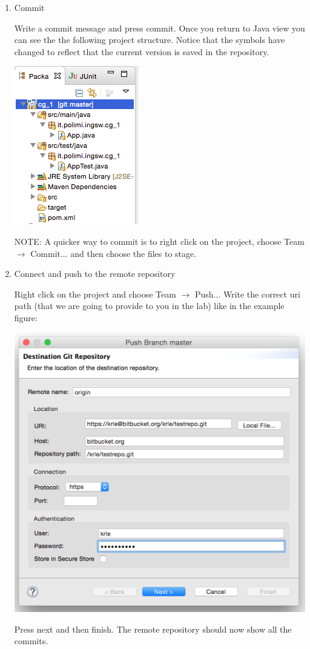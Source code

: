 \documentclass{article}
\begin{document}
\begin{enumerate}
\item Commit

Write a commit message and press commit.
Once you return to Java view you can see the the following project
structure. Notice that the symbols have changed to reflect that the
current version is saved in the repository.

\begin{center}
\includegraphics[scale=0.6]{figures/s9.png}
\end{center}

NOTE: A quicker way to commit is to right click on the project, choose 
Team $\rightarrow$ Commit... and then choose the files to stage.

\item Connect and push to the remote repository

Right click on the project and choose Team $\rightarrow$ Push...
Write the correct uri path (that we are going to provide to you in the
lab) like in the example figure: 

\begin{center}
\includegraphics[scale=0.35]{figures/s10.png}
\end{center}

Press next and then finish.
The remote repository should now show all the commits.

\end{enumerate}
\end{document}
